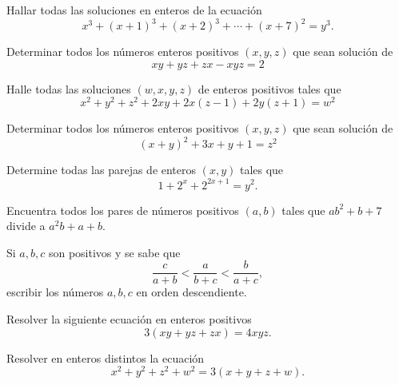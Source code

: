 \begin{exercise}
    Hallar todas las soluciones en enteros de la ecuación
    \[
        x^3 + (x + 1)^3 + (x + 2)^3 + \cdots + (x + 7)^2 = y^3.
    \]
\end{exercise}

\begin{exercise}
    Determinar todos los números enteros positivos $(x,y,z)$ que sean solución de
    \[
        xy + yz + zx - xyz = 2
    \]
\end{exercise}

\begin{exercise}
    Halle todas las soluciones $(w,x,y,z)$ de enteros positivos tales que
    \[
        x^2 + y^2 + z^2 + 2xy + 2x(z - 1) + 2y(z + 1) = w^2
    \]
\end{exercise}

\begin{exercise}
    Determinar todos los números enteros positivos $(x,y,z)$ que sean solución de
    \[
        (x + y)^2 + 3x + y + 1 = z^2
    \]
\end{exercise}

\begin{exercise}
    Determine todas las parejas de enteros $(x, y)$ tales que
    \[
        1 + 2^x + 2^{2x + 1} = y^2.
    \]
\end{exercise}

\begin{problem}
    Encuentra todos los pares de números positivos $(a, b)$ tales que $ab^2 + b + 7$ divide a $a^2 b + a + b$.
\end{problem}

\begin{exercise}
    Si $a,b,c$ son positivos y se sabe que
    \[
        \frac{c}{a + b} < \frac{a}{b + c} < \frac{b}{a + c},
    \]
    escribir los números $a,b,c$ en orden descendiente.
\end{exercise}

\begin{exercise}
    Resolver la siguiente ecuación en enteros positivos
    \[
        3(xy + yz + zx) = 4xyz.
    \]
\end{exercise}

\begin{problem}
    Resolver en enteros distintos la ecuación
    \[
        x^2 + y^2 + z^2 + w^2 = 3(x + y + z + w).
    \]
\end{problem}